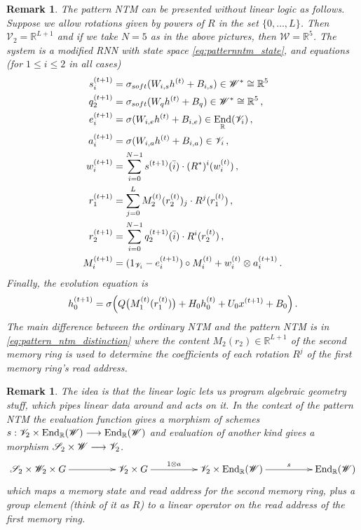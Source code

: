 \documentclass[english,letter paper,12pt,leqno]{article}
\theoremstyle{example}
\newtheorem{remark}[theorem]{Remark}
\numberwithin{equation}{section}
\def\be{\begin{equation}}
\def\ee{\end{equation}}
\DeclareMathOperator{\End}{End}
\begin{document}
\begin{remark}\label{remark:alt_presentation} The pattern NTM can be presented without linear logic as follows. Suppose we allow rotations given by powers of $R$ in the set $\{0,\ldots,L\}$. Then $\mathscr{V}_2 = \mathbb{R}^{L+1}$ and if we take $N = 5$ as in the above pictures, then $\mathscr{W} = \mathbb{R}^5$. The system is a modified RNN with state space \eqref{eq:patternntm_state}, and equations (for $1 \le i \le 2$ in all cases)
\begin{align}
s_i^{(t+1)} &= \softmax( W_{i,s} h^{(t)} + B_{i,s} ) \in \mathscr{W}^* \cong \mathbb{R}^5\,\\
q_2^{(t+1)} &= \softmax( W_q h^{(t)} + B_q ) \in \mathscr{W}^* \cong \mathbb{R}^5\,,\\
e_i^{(t+1)} &= \relu( W_{i,e} h^{(t)} + B_{i,e} ) \in \End_{\mathbb{R}}(\mathscr{V}_i)\,,\\
a_i^{(t+1)} &= \relu( W_{i,a} h^{(t)} + B_{i,a} ) \in \mathscr{V}_i\,,\\
w_i^{(t+1)} &= \sum_{i=0}^{N-1} s^{(t+1)}(\bar{i}) \cdot (R^*)^i( w^{(t)}_i )\,,\\
r_1^{(t+1)} &= \sum_{j=0}^L M_2^{(t)}(r_2^{(t)})_j \cdot R^j(r_1^{(t)})\,,\label{eq:pattern_ntm_distinction}\\
r_2^{(t+1)} &= \sum_{i=0}^{N-1} q_2^{(t+1)}(\bar{i}) \cdot R^i( r_2^{(t)} )\,,\\
M_i^{(t+1)} &= (1_{\mathscr{V}_i} - e_i^{(t+1)}) \circ M_i^{(t)} + w_i^{(t)} \otimes a_i^{(t+1)}\,.
\end{align}
Finally, the evolution equation is
\be
h_0^{(t+1)} = \relu\Big( Q\big( M_1^{(t)}(r_1^{(t)}) \big) + H_0 h_0^{(t)} + U_0 x^{(t+1)} + B_0 \Big)\,.
\ee
The main difference between the ordinary NTM and the pattern NTM is in \eqref{eq:pattern_ntm_distinction} where the content $M_2(r_2) \in \mathbb{R}^{L+1}$ of the second memory ring is used to determine the coefficients of each rotation $R^j$ of the first memory ring's read address.
\end{remark}

\begin{remark} The idea is that the linear logic lets us program algebraic geometry stuff, which pipes linear data around and acts on it. In the context of the pattern NTM the evaluation function gives a morphism of schemes $s: \mathscr{V}_2 \times \End_{\mathbb{R}}(\mathscr{W}) \lto \End_{\mathbb{R}}(\mathscr{W})$ and evaluation of another kind gives a morphism $\mathscr{S}_2 \times \mathscr{W} \longrightarrow \mathscr{V}_2$. 
\[
\xymatrix@C+2pc{
\mathscr{S}_2 \times \mathscr{W}_2 \times G \ar[r] & \mathscr{V}_2 \times G \ar[r]^-{1 \otimes a} & \mathscr{V}_2 \times \End_{\mathbb{R}}(\mathscr{W}) \ar[r]^-s & \End_{\mathbb{R}}(\mathscr{W})
}
\]
which maps a memory state and read address for the second memory ring, plus a group element (think of it as $R$) to a linear operator on the read address of the first memory ring.
\end{remark}
\end{document}
